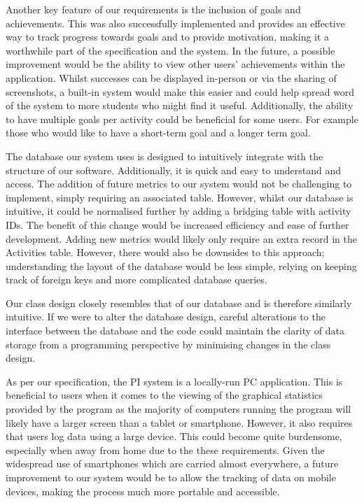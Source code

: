 \documentclass[11pt]{article}
\begin{document}
Another key feature of our requirements is the inclusion of 
goals and achievements. This was also successfully implemented and provides 
an effective way to track progress towards goals and to provide motivation, 
making it a worthwhile part of the specification and the system. In the future, a possible
improvement would be the ability to view other users' 
achievements within the application. Whilst successes can be displayed in-person or via 
the sharing of screenshots, a built-in system 
would make this easier and could help spread word of the system to more 
students who might find it useful. Additionally, the ability to have multiple 
goals per activity could be beneficial for some users. For example those who 
would like to have a short-term goal and a longer term goal.\par

The database our system uses is designed to intuitively integrate with the 
structure of our software. Additionally, it is quick and easy to understand and access. The 
addition of future metrics to our system would not be challenging to implement, 
simply requiring an associated table. However, whilst our database is intuitive, 
it could be normalised further by adding a bridging table with 
activity IDs. The benefit of this change would be increased efficiency and 
ease of further development. Adding new metrics would likely only require an 
extra record in the Activities table. However, there would also be downsides 
to this approach; understanding the layout of the database would be less 
simple, relying on keeping track of foreign keys and more complicated database 
queries. \par

Our class design closely resembles that of our database and is therefore
similarly intuitive. If we were to alter the database design, careful
alterations to the interface between the database and the code could maintain
the clarity of data storage from a programming perspective by minimising
changes in the class design.\par

As per our specification, the PI system is a locally-run PC application. This 
is beneficial to users when it comes to the viewing of the graphical statistics 
provided by the program as the majority of computers running the program will 
likely have a larger screen than a tablet or smartphone. However, it also 
requires that users log data using a large device. This could become quite 
burdensome, especially when away from home due to the these requirements. 
Given the widespread use of smartphones which are 
carried almost everywhere, a future improvement to our system would be 
to allow the tracking of data on mobile devices, making the process much more 
portable and accessible.\par
\end{document}
